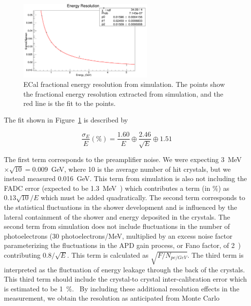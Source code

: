 \begin{figure}[htb]
  \centering
      \includegraphics[width=0.6\textwidth]{pics/performance/eResFitMC.png}
  \caption[ECal fractional energy resolution fitted from simulation]{ECal fractional energy resolution from simulation. The points show the fractional energy resolution extracted from simulation, and the red line is the fit to the points.}
  \label{Figure:eResFitMC}
\end{figure}

The fit shown in Figure~\ref{Figure:eResFitMC} is described by 

\begin{equation}
\label{eq:eResMC}
\dfrac{\sigma_E}{E} (\%) = \dfrac{1.60}{E} \oplus \dfrac{2.46}{\sqrt{E}} \oplus 1.51
\end{equation}

The first term corresponds to the preamplifier noise. We were expecting 3~MeV$\times \sqrt{10} = 0.009$~GeV, where 10 is the average number of hit crystals, but we instead measured 0.016~GeV. This term from simulation is also not including the FADC error (expected to be 1.3~MeV~\cite{charles_2014}) which contributes a term (in $\%$) as $0.13\sqrt{10}/E$ which must be added quadratically. The second term corresponds to the statistical fluctuations in the shower development and is influenced by the lateral containment of the shower and energy deposited in the crystals. The second term from simulation does not include fluctuations in the number of photoelectrons (30 photoelectrons/MeV, multiplied by an excess noise factor parameterizing the fluctuations in the APD gain process, or Fano factor, of 2~\cite{panda_2008}) contributing $0.8/\sqrt{E}$. This term is calculated as $\sqrt{F/N_{pe/GeV}}$. The third term is interpreted as the fluctuation of energy leakage through the back of the crystals. This third term should include the crystal-to crystal inter-calibration error which is estimated to be 1~$\%$.~\cite{szumila-vance_hps_ecal_2014} By including these additional resolution effects in the measurement, we obtain the resolution as anticipated from Monte Carlo

